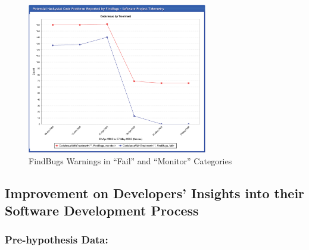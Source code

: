 \begin{figure}[p]
  \center
  \includegraphics[width=0.70\textwidth]{figures/CSDL-FindBugs}
  \caption{FindBugs Warnings in ``Fail'' and ``Monitor'' Categories} 
  \label{fig:CSDL-FindBugs}
\end{figure}










\clearpage
\subsection{Improvement on Developers' Insights into their Software Development Process}
\label{EvaluationInCSDL:EventsDescription:BuildAnalysis}

\subsubsection{Pre-hypothesis Data:}

